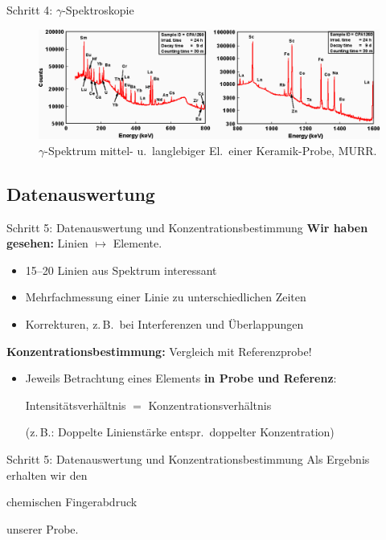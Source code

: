\documentclass[xcolor=x11names, aspectratio=169]{beamer}
\begin{document}
\begin{frame}{Schritt 4: $\gamma$-Spektroskopie}
\begin{figure}
\includegraphics[width=\textwidth]{img/spect-2.png}
\caption{$\gamma$-Spektrum mittel- u.\ langlebiger El.\ einer Keramik-Probe, MURR.}
\end{figure}
\end{frame}

\subsection{Datenauswertung}

\begin{frame}{Schritt 5: Datenauswertung und Konzentrationsbestimmung}
\textbf{Wir haben gesehen:} Linien $\mapsto$ Elemente.
\begin{itemize}
\item 15--20 Linien aus Spektrum interessant
\item Mehrfachmessung einer Linie zu unterschiedlichen Zeiten
\item Korrekturen, z.\,B.\ bei Interferenzen und Überlappungen
\end{itemize}\medskip\pause

\textbf{Konzentrationsbestimmung:} Vergleich mit Referenzprobe!
\begin{itemize}
\item Jeweils Betrachtung eines Elements \textbf{in Probe und Referenz}:

\begin{center}
\alert{Intensitätsverhältnis $=$ Konzentrationsverhältnis}
\end{center}

(z.\,B.: Doppelte Linienstärke entspr.\ doppelter Konzentration)
\end{itemize}
\end{frame}

\begin{frame}{Schritt 5: Datenauswertung und Konzentrationsbestimmung}
\vspace*{-1em}
\Large Als Ergebnis erhalten wir den
\begin{huge}
\begin{center}
chemischen Fingerabdruck
\end{center}
\end{huge}
unserer Probe.
\end{frame}
\end{document}
